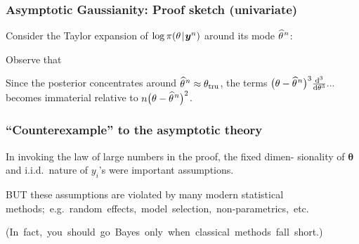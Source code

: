 \documentclass[18pt, handout]{beamer}
\newcommand{\defineTightItemizeSpacing}{%
	\setlength{\abovedisplayskip}{.25\baselineskip}%
	\setlength{\belowdisplayskip}{.25\baselineskip}%
}
\newenvironment{tightEquation*}{%
	\defineTightItemizeSpacing%
	\begin{equation*}
}{
	\end{equation*} \ignorespacesafterend
}
\newcommand{\given}{\thinnerspace | \thinnerspace}
\newcommand{\diff}{\operatorname{\mathrm{d}}\!{}}
\newcommand{\thinnerspace}{\mskip.5\thinmuskip}
\newcommand{\expectation}{\mathbb{E}}
\newcommand{\density}{\pi}
\newcommand{\likelihood}{L}
\newcommand{\by}{\bm{y}}
\newcommand{\btheta}{\bm{\theta}}
\begin{document}
\newcommand{\samplesizeDependentMap}{\widehat{\theta}^{\text{\raisebox{.1ex}{$\thinnerspace n$}}}}
\begin{frame}
\frametitle{Asymptotic Gaussianity: Proof sketch (univariate)}
Consider the Taylor expansion of $\log \density(\theta \given \by^n)$ around its mode $\samplesizeDependentMap$:
\begin{tightEquation*}
\end{tightEquation*}
Observe that 
\begin{tightEquation*}
\end{tightEquation*}
Since the posterior concentrates around $\samplesizeDependentMap \approx \theta_\truthSub$, the terms $\big( \theta - \samplesizeDependentMap \big)^3 \frac{\diff^3}{\diff \theta^3} ...$ becomes immaterial relative to $n \big( \theta - \samplesizeDependentMap \big)^2$. 
\hfill \qedsymbol
\end{frame}

\begin{frame}
\frametitle{``Counterexample'' to the asymptotic theory}
In invoking the law of large numbers in the proof, the fixed dimen- sionality of $\btheta$ and i.i.d.\ nature of $y_i$'s were important assumptions.

B{\small UT} these assumptions are violated by many modern statistical \mbox{methods; e.g.\ random effects, model selection, non-parametrics, etc.}

\mbox{(In fact, you should go Bayes only when classical methods fall short.)}
\end{frame}
\end{document}
